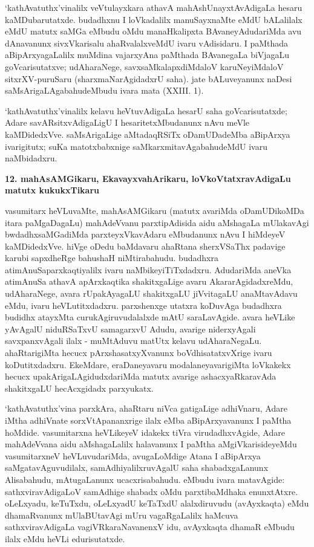 `kathAvatuthx'vinalilx veVtulayxkara athavA mahAshUnayxtAvAdigaLa hesaru kaMDu\-barutatxde. budadhxnu  I loVkadalilx manuSayxnaMte eMdU bALalilalx eMdU matutx saMGa eMbudu oMdu manaHkalipxta BAvaneyAdudariMda avu dAnavanunx sivxVkarisalu ahaRvalalxveMdU ivaru vAdisidaru. I paMthada aBipArxyagaLalilx muMdina vajarxyAna paMthada BAvanegaLa biVjagaLu goVcarisutatxve; udAharaNege, savxsaMkalapxdiMdaloV karuNeyiMdaloV sitxrXV-puruSaru (sharxmaNarAgidadxrU saha). jate bALuveyanunx naDesi saMsArigaLAgabahudeMbudu ivara mata {\rm (XXIII. 1)}.

`kathAvatuthx'vinalilx kelavu heVtuvAdigaLa hesarU saha goVcarisutatxde; Adare savARsitxvAdigaLigU I hesaritetxMbudanunx nAvu meVle kaMDidedxVve. saMsArigaLige aMtadaqRSiTx oDamUDadeMba aBipArxya ivarigitutx; suKa matotxbabxnige saMkarxmita\-vAgabahudeMdU ivaru naMbidadxru.

\begin{center}
{\textbf{\Large 12. mahAsAMGikaru, EkavayxvahArikaru, loVkoVtatxravAdigaLu matutx kukukxTikaru}}
\end{center}

vasumitarx heVLuvaMte, mahAsAMGikaru (matutx avariMda oDamUDikoMDa itara paMgaDagaLu) mahAdeVvanu parxtipAdisida aidu aMshagaLa mUlakavAgi bwdadhxsaMGadiMda parxteyxVkavAdaru eMbudanunx nAvu I hiMdeyeV kaMDidedxVve. hiVge oDedu baMdavaru ahaRtana sherxVSaThx padavige karubi sapxdheRge bahushaH niMtirabahudu. budadhxra atimAnuSaparxkaqtiyalilx ivaru naMbikeyiTiTxdadxru. AdudariMda aneVka atimAnuSa athavA apArxkaqtika shakitxgaLige avaru AkararAgidadxreMdu, udAharaNege, avara rUpakAyagaLU shakitxgaLU jiVvitagaLU anaMtavAdavu eMdu, ivaru heVLutitxdadxru. parxshenxge utatxra koDuvAga budadhxra budidhx atayxMta curukAgiruvudalalxde mAtU saraLavAgide. avara heVLike yAvAgalU niduRSaTxvU samagarxvU Adudu, avarige niderxyAgali savxpanxvAgali ilalx - muMtAduvu matUtx kelavu udAharaNegaLu. ahaRtarigiMta hecucx pArxshasatxyXvanunx boVdhisatatxvXrige ivaru koDutitxdadxru. EkeMdare, eraDaneyavaru modalaneyavarigiMta loVkakekx hecucx upakArigaLAgidudxdariMda matutx avarige ashacxyaRkaravAda shakitxgaLU hecAcxgidadx parxyukatx.

`kathAvatuthx'vina parxkAra, ahaRtaru niVca gatigaLige adhiVnaru, Adare iMtha adhiVnate sorxVtApananxrige ilalx eMba aBipArxyavanunx I paMtha hoMdide. vasumitarxna heVLikeyeV idakekx tiVra virudadhxvAgide, Adare mahAdeVvana aidu aMshagaLalilx halavanunx I paMtha aMgiVkarisideyeMdu vasumitarxneV heVLuvudariMda, avugaLoMdige Atana I aBipArxya saMgatavAguvudilalx, samAdhiyalilxruvAgalU saha shabadxgaLanunx Alisabahudu, mAtugaLanunx ucacxrisabahudu. eMbudu ivara matavAgide: sathxviravAdigaLoV samAdhige shabadx oMdu parxtibaMdhaka enunxtAtxre. oLeLxyadu, keTuTxdu, oLeLxyadU keTaTxdU alalxdiruvudu (avAyxkaqta) eMdu dhamaRvanunx mUlaBUtavAgi mUru vagaRgaLalilx haMcuva sathxviravAdigaLa vagiVRkaraNavanenxV idu, avAyxkaqta dhamaR eMbudu ilalx eMdu heVLi edurisutatxde.

